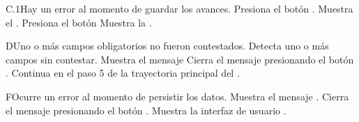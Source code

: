 
\begin{UCtrayectoriaA}{C.1}{Hay un error al momento de guardar los avances.}
\UCpaso[\UCactor] Presiona el botón .
\UCpaso Muestra el .
\UCpaso[\UCactor] Presiona el botón  
\UCpaso Muestra la .
\end{UCtrayectoriaA}


\begin{UCtrayectoriaA}{D}{Uno o más campos obligatorios no fueron contestados.}
	\UCpaso Detecta uno o más campos sin contestar.
    \UCpaso Muestra el mensaje 
    \UCpaso[\UCactor] Cierra el mensaje presionando el botón .
    \UCpaso Continua en el paso 5 de la trayectoria principal del .
\end{UCtrayectoriaA}


\begin{UCtrayectoriaA}{F}{Ocurre un error al momento de persistir los datos.}
	\UCpaso Muestra el mensaje .
	\UCpaso[\UCactor] Cierra el mensaje presionando el botón .
	\UCpaso Muestra la interfaz de usuario .
\end{UCtrayectoriaA}